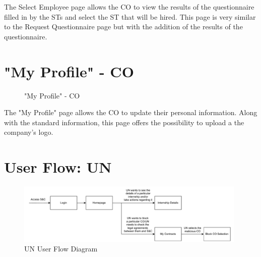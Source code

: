 \par The Select Employee page allows the CO to view the results of the questionnaire filled in by the STs and select
the ST that will be hired. This page is very similar to the Request Questionnaire page but with the addition of the
results of the questionnaire.

\section{"My Profile" - CO}
\label{subsec:profile-co}%

\begin{figure}[H]
    \centering
    \caption{"My Profile" - CO}
    \label{fig:my-profile-co}
\end{figure}

\par The "My Profile" page allows the CO to update their personal information. Along with the standard information,
this page offers the possibility to upload a the company's logo.

\section{User Flow: UN}
\label{sec:user-flow-un}%

\begin{figure}[H]
    \centering
    \includegraphics[width=0.98\textwidth]{Images/GUI/UN/Diagram.pdf}
    \caption{UN User Flow Diagram}
    \label{fig:un-user-flow-diagram}
\end{figure}

